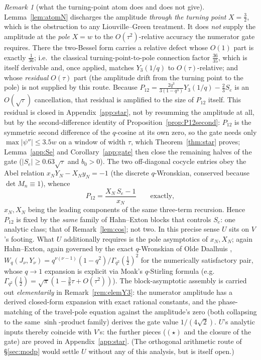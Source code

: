 \documentclass[11pt]{article}
\theoremstyle{plain}
\theoremstyle{definition}
\theoremstyle{remark}
\newtheorem{remark}[theorem]{Remark}
\begin{document}
\begin{remark}[what the turning-point atom does and does not give]\label{rem:Ugap}
Lemma~\ref{lem:atomN} discharges the amplitude \emph{through the turning point} $X=\tfrac32$, which
is the obstruction to any Liouville--Green treatment. It does \emph{not} supply the amplitude at
the \emph{pole} $X=w$ to the
$O(\tau^2)$-relative accuracy the numerator gate requires. There the two-Bessel form carries a
relative defect whose $O(1)$ part is exactly $\tfrac1{36}$; i.e.\ the classical
turning-point-to-pole connection factor $\tfrac{36}{35}$, which is itself derivable and, once
applied, matches $Y_3(1/q)$ to $O(\tau)$-relative; and whose \emph{residual} $O(\tau)$ part (the
amplitude drift from the turning point to the pole) is not supplied by this route. Because
$P_{12}=\tfrac{2q^3}{3(1-q^3)}Y_3(1/q)-\tfrac23S_e$ is an $O(\sqrt\tau)$ cancellation, that residual
is amplified to the size of $P_{12}$ itself. This residual is closed in
Appendix~\ref{app:star}, not by resumming the amplitude at all, but by the second-difference
identity of Proposition~\ref{prop:P12second}: $P_{12}$ is the symmetric second difference of the
$q$-cosine at its own zero, so the gate needs only $\max|\psi''|\le3.5w$ on a window of width
$\tau$, which Theorem~\ref{thm:star} proves; Lemma~\ref{app:Se} and Corollary~\ref{app:gate} then
close the remaining halves of the gate ($|S_e|\ge0.63\sqrt\tau$ and $b_0>0$). The two
off-diagonal cocycle entries obey the Abel relation $x_NY_N-X_Ny_N=-1$ (the discrete $q$-Wronskian,
conserved because $\det M_n\equiv1$), whence
\[
   P_{12}=\frac{X_N\,S_e-1}{x_N}\qquad\text{exactly},
\]
$x_N,X_N$ being the leading components of the same three-term recursion. Hence $P_{12}$ is fixed by the
\emph{same} family of Hahn--Exton blocks that controls $S_e$: one analytic class; that of
Remark~\ref{lem:cos}; not two. In this precise sense $U$ sits on $V$'s footing. What $U$ additionally
requires is the pole asymptotics of $x_N,X_N$; again Hahn--Exton, again governed by the exact
$q$-Wronskian of Olde Daalhuis \cite{Daalhuis1994},
$W_q(J_\nu,Y_\nu)=q^{\nu(\nu-1)}(1-q^2)/\Gamma_{q^2}(\tfrac12)^2$ for the numerically satisfactory pair,
whose $q\to1$ expansion is explicit via Moak's $q$-Stirling formula \cite{Moak1984} (e.g.\
$\Gamma_{q^2}(\tfrac12)=\sqrt\pi(1-\tfrac38\tau+O(\tau^2))$). The block-asymptotic assembly is carried
out \emph{elementarily} in Remark~\ref{rem:elemY3}: the numerator amplitude has a derived closed-form
expansion with exact rational constants, and the phase-matching of the travel-pole equation against the
amplitude's zero (both collapsing to the same $\sinh$-product family) derives the gate value
$1/(4\sqrt2)$. $U$'s analytic inputs thereby coincide with $V$'s: the further pieces ($(\star)$
and the closure of the gate) are proved in Appendix~\ref{app:star}. (The orthogonal arithmetic
route of
\S\ref{sec:modp} would settle $U$ without any of this analysis, but is itself open.)
\end{remark}
\end{document}
